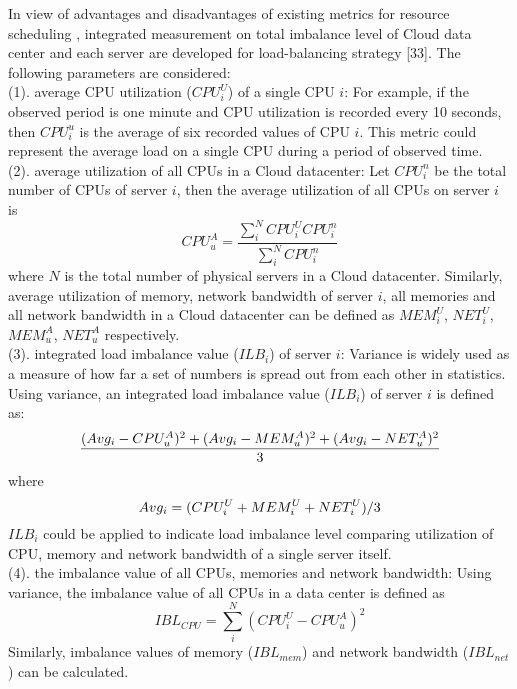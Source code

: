 \documentclass[3p, twocolumn]{elsarticle}
\begin{document}
In view of advantages and disadvantages of existing metrics for resource scheduling \cite{IEEEhowto:Singh}\cite{IEEEhowto:Wood}\cite{IEEEhowto:Zheng}\cite{IEEEhowto:Tian2}, integrated measurement on total imbalance level of Cloud data center and each server are developed for load-balancing strategy [33]. The following parameters are considered:\\
(1). average CPU utilization ($CPU_i^{U}$) of a single CPU $i$: For example, if the observed period is one minute and CPU utilization is recorded every 10 seconds, then $CPU_i^{u}$ is the average of six recorded values of CPU $i$. This metric could represent the average load on a single CPU during a period of observed time.\\
(2). average utilization of all CPUs in a Cloud datacenter: Let $CPU_i^{n}$ be the total number of CPUs of server $i$, then the average utilization of all CPUs on server $i$ is
\begin{equation}
CPU_u^{A}=\frac{\sum_{i}^{N}CPU_i^{U}CPU_i^{n}}{\sum_{i}^{N}CPU_i^{n}}
\end{equation}
where $N$ is the total number of physical servers in a Cloud datacenter. Similarly, average utilization of memory, network bandwidth of server $i$, all memories and all network bandwidth in a Cloud datacenter can be defined as $MEM_i^{U}$, $NET_i^{U}$, $MEM_u^{A}$, $NET_u^{A}$ respectively.\\
(3). integrated load imbalance value ($ILB_i$) of server $i$: Variance is widely used as a measure of how far a set of numbers is spread out from each other in statistics. Using variance, an integrated load imbalance value ($ILB_i$) of server $i$ is defined as:
\begin{equation}
\footnotesize
\frac{(Avg_i-CPU_u^{A})^2+(Avg_i-MEM_u^{A})^2+(Avg_i-NET_u^{A})^2}{3}
\end{equation}
where
\begin{equation}
\small
Avg_i=(CPU_i^{U}+MEM_i^{U}+NET_i^{U})/3
\end{equation}
$ILB_i$ could be applied to indicate load imbalance level comparing utilization of CPU, memory and network bandwidth of a single server itself.\\
(4). the imbalance value of all CPUs, memories and network bandwidth:
Using variance, the imbalance value of all CPUs in a data center is defined as
\begin{equation}
IBL_{CPU}=\sum_{i}^{N}(CPU_i^{U}-CPU_u^{A})^2
\end{equation}
Similarly, imbalance values of memory ($IBL_{mem}$) and network bandwidth ($IBL_{net}$) can be calculated.
\end{document}
